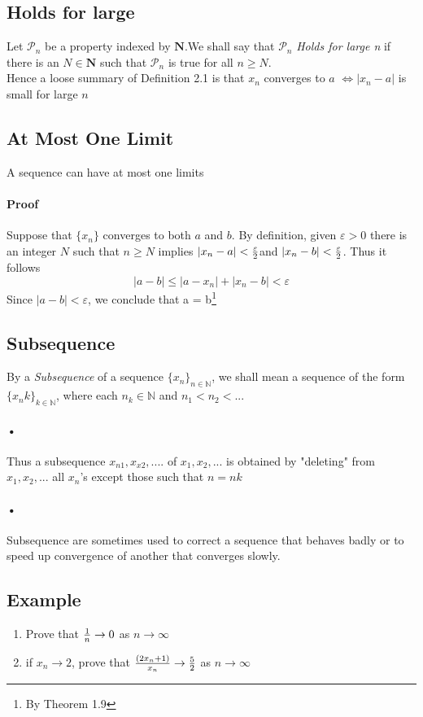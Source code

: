 \documentclass{report}
\begin{document}
\subsection{Holds for large}
Let $\mathcal{P}_n$ be a property indexed by $\mathbf{N}$.We shall say that $\mathcal{P}_n$  \emph{Holds for large n} if there is an $N \in \mathbf{N}$ such that $\mathcal{P}_n$ is true for all $n\geq N$. \\
Hence a loose summary of Definition 2.1 is that $x_n$ converges to $a$ $\iff |x_n - a|$ is small for large $n$

\subsection{At Most One Limit}
A sequence can have at most one limits
\paragraph{Proof}Suppose that $\{x_n\}$ converges to both $a$ and $b$. By definition, given $\varepsilon > 0$ there is an integer $N$ such that $n\geq N$ implies $|x_n - a| < {\varepsilon \over 2} $and $|x_n - b| < {\varepsilon \over 2} $. Thus it follows
$${|a-b|} \leq {|a-x_n| + |x_n-b|}<\varepsilon $$
Since $|a-b| < \varepsilon$, we conclude that a = b\footnote{By Theorem 1.9}

\subsection{Subsequence}
\begin{defbox}
By a \emph{Subsequence} of a sequence $\{x_n\}_{n\in\mathbb N}$, we shall mean a sequence of the form $\{x_nk\}_{k\in \mathbb N}$, where each $n_k\in \mathbb N$ and $n_1<n_2<...$
\end{defbox}
\paragraph{•} Thus a subsequence $x_{n1},x_{x2},....$ of $x_1,x_2,...$ is obtained by "deleting" from $x_1,x_2,...$ all $x_n$'s except those such that $n=nk$\\
\paragraph{•} Subsequence are sometimes used to correct a sequence that behaves badly or to speed up convergence of another that converges slowly.


\subsection{Example}
\begin{enumerate}
    \item Prove that ${1\over n} \to 0$ as $n\to \infty$
   \item if $x_n \to 2$, prove that ${(2x_n + 1)\over x_n} \to {5\over 2}$ as $n\to \infty$
\end{enumerate}
\end{document}
